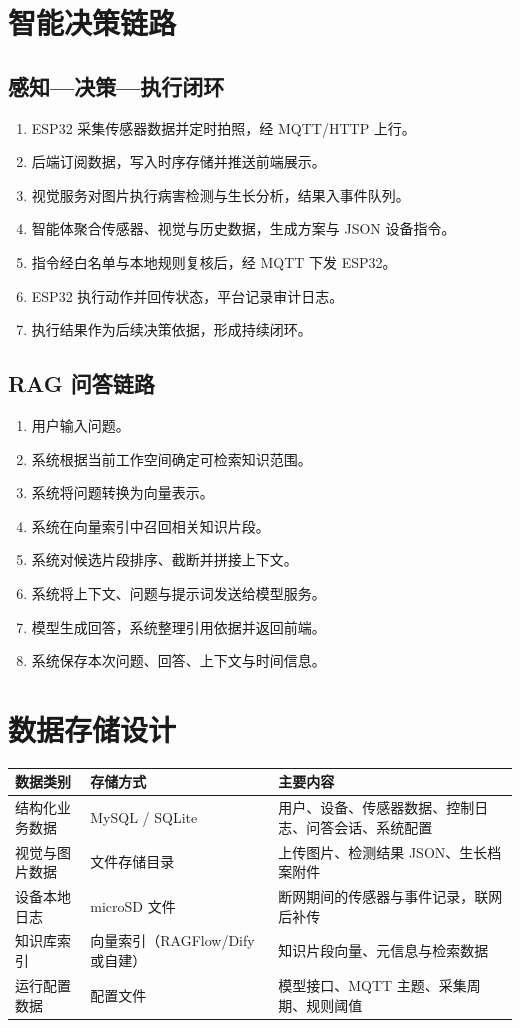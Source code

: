 \documentclass[11pt]{ctexart}
\begin{document}
\section{智能决策链路}
\subsection{感知—决策—执行闭环}
\begin{enumerate}
  \item ESP32 采集传感器数据并定时拍照，经 MQTT/HTTP 上行。
  \item 后端订阅数据，写入时序存储并推送前端展示。
  \item 视觉服务对图片执行病害检测与生长分析，结果入事件队列。
  \item 智能体聚合传感器、视觉与历史数据，生成方案与 JSON 设备指令。
  \item 指令经白名单与本地规则复核后，经 MQTT 下发 ESP32。
  \item ESP32 执行动作并回传状态，平台记录审计日志。
  \item 执行结果作为后续决策依据，形成持续闭环。
\end{enumerate}

\subsection{RAG 问答链路}
\begin{enumerate}
  \item 用户输入问题。
  \item 系统根据当前工作空间确定可检索知识范围。
  \item 系统将问题转换为向量表示。
  \item 系统在向量索引中召回相关知识片段。
  \item 系统对候选片段排序、截断并拼接上下文。
  \item 系统将上下文、问题与提示词发送给模型服务。
  \item 模型生成回答，系统整理引用依据并返回前端。
  \item 系统保存本次问题、回答、上下文与时间信息。
\end{enumerate}

\section{数据存储设计}
\begin{longtable}{p{3.4cm}p{4.4cm}p{7.0cm}}
  \toprule
  数据类别 & 存储方式 & 主要内容 \\
  \midrule
  结构化业务数据 & MySQL / SQLite & 用户、设备、传感器数据、控制日志、问答会话、系统配置 \\
  视觉与图片数据 & 文件存储目录 & 上传图片、检测结果 JSON、生长档案附件 \\
  设备本地日志 & microSD 文件 & 断网期间的传感器与事件记录，联网后补传 \\
  知识库索引 & 向量索引（RAGFlow/Dify 或自建） & 知识片段向量、元信息与检索数据 \\
  运行配置数据 & 配置文件 & 模型接口、MQTT 主题、采集周期、规则阈值 \\
  \bottomrule
\end{longtable}
\end{document}
